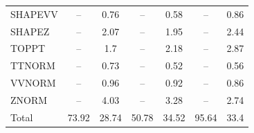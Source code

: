 \begin{table}[H]
\begin{center}
\begin{footnotesize}
\begin{tabular}{lcccccc}
				SHAPEVV & -- &  0.76 & -- &  0.58 & -- &  0.86 \\
				SHAPEZ & -- &  2.07 & -- &  1.95 & -- &  2.44 \\
				TOPPT & -- &  1.7 & -- &  2.18 & -- &  2.87 \\
				TTNORM & -- &  0.73 & -- &  0.52 & -- &  0.56 \\
				VVNORM & -- &  0.96 & -- &  0.92 & -- &  0.86 \\
				ZNORM & -- &  4.03 & -- &  3.28 & -- &  2.74 \\
				Total &  73.92  &  28.74 &  50.78  &  34.52 &  95.64  &  33.4 \\ \hline \hline
			\end{tabular}
			\label{tab:SysUncertainties_2300}
        \end{footnotesize}
	\end{center}
\end{table}


